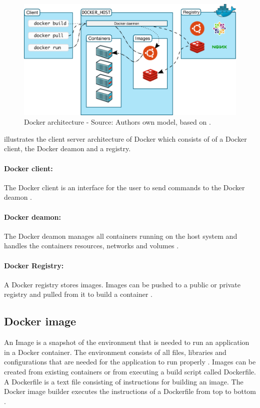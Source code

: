 \begin{figure}[h]%
\centering
\includegraphics[scale=0.5]{images/03_background/docker_architecture}%
\caption{Docker architecture - Source: Authors own model, based on \cite{Docker2020Docs}.}%
\label{fig:spark_docker_architecture}%
\end{figure}

 illustrates the client server architecture of Docker which consists of of a Docker client, the Docker deamon and a registry.


\paragraph{Docker client:} The Docker client is an interface for the user to send commands to the Docker deamon \cite{Docker2020Docs}.


\paragraph{Docker deamon:} The Docker deamon manages all containers running on the host system and handles the containers resources, networks and volumes \cite{Bullington2020Docker}.


\paragraph{Docker Registry:} A Docker registry stores images. Images can be pushed to a public or private registry and pulled from it to build a container \cite{Docker2020Docs}.


\subsection{Docker image}
An Image is a snapshot of the environment that is needed to run an application in a Docker container. The environment consists of all files, libraries and configurations that are needed for the application to run properly \cite{Docker2020Docs, Nickoloff2019Docker}.
Images can be created from existing containers or from executing a build script called Dockerfile. A Dockerfile is a text file consisting of instructions for building an image. The Docker image builder executes the instructions of a Dockerfile from top to bottom \cite{Nickoloff2019Docker}.

